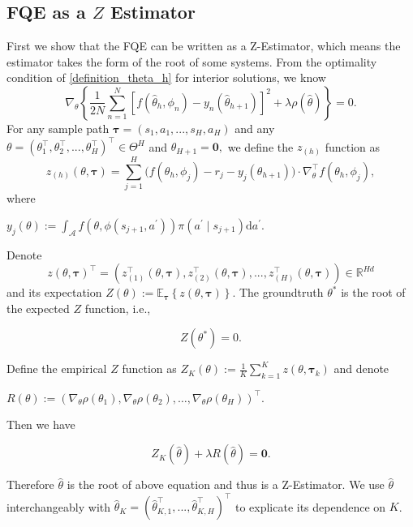 \documentclass{article}
\numberwithin{equation}{section}
\theoremstyle{plain}
\theoremstyle{definition}
\theoremstyle{remark}
\begin{document}
\subsection{FQE as a $Z$ Estimator}
First we show that the FQE can be written as a Z-Estimator, which means the estimator takes the form of the root of some systems. From the optimality condition of \eqref{definition_theta_h} for interior solutions, we know 
    $$
    \nabla_{\theta}\left\{\frac{1}{2N} \sum_{n=1}^N \left[f(\widehat{\theta}_h,\phi_n) - y_n(\widehat{\theta}_{h+1})\right]^2 + \lambda \rho(\widehat{\theta})\right\} = 0.
    $$
For any sample path $\boldsymbol{\tau} = (s_1,a_1,...,s_H,a_H)$ and any $\theta = (\theta_1^{\top},\theta_2^{\top},...,\theta_H^{\top})^{\top} \in \Theta^H$ and $\theta_{H+1} = \boldsymbol{0},$ we define the $z_{(h)}$ function as
\begin{equation*}
    z_{(h)}(\theta,\boldsymbol{\tau}) = \sum_{j=1}^H \bigg(f(\theta_h,\phi_j) - r_j - y_j(\theta_{h+1})\bigg) \cdot \nabla_{\theta}^{\top} f(\theta_h,\phi_j),
\end{equation*}
where \begin{footnotesize}$y_j(\theta) := \int_{\mathcal{A}} f(\theta,\phi(s_{j+1},a^{\prime})) \pi(a^{\prime}\mid s_{j+1}) \mathrm{d} a^{\prime}.$ \end{footnotesize} Denote 
$$z(\theta,\boldsymbol{\tau})^{\top} = (z_{(1)}^{\top}(\theta,\boldsymbol{\tau}),  z_{(2)}^{\top}(\theta,\boldsymbol{\tau}), ..., z_{(H)}^{\top}(\theta,\boldsymbol{\tau})) \in \mathbb{R}^{Hd}$$
and its expectation $Z(\theta) := \mathbb{E}_{\boldsymbol{\tau}} \left\{z(\theta,\boldsymbol{\tau})\right\}.$ The groundtruth $\theta^*$ is the root of the expected $Z$ function, i.e., 
\begin{small}
\begin{equation}
    Z(\theta^*) = 0.
\end{equation}
\end{small}
Define the empirical $Z$ function as $Z_K\left(\theta\right) := \frac{1}{K} \sum_{k=1}^K z(\theta,\boldsymbol{\tau}_k)$ and denote \begin{small} $R(\theta) := (\nabla_{\theta} \rho(\theta_1), \nabla_{\theta} \rho(\theta_2), \ldots, \nabla_{\theta} \rho(\theta_H))^{\top}.$\end{small} Then we have
\begin{small}
\begin{equation}\label{Z-Estimator}
    Z_K(\widehat{\theta}) + \lambda R(\widehat{\theta})= \boldsymbol{0}.
\end{equation}
\end{small}
Therefore $\widehat{\theta}$ is the root of above equation and thus is a Z-Estimator. We use $\widehat \theta$ interchangeably with $\widehat{\theta}_K = (\widehat{\theta}_{K,1}^{\top},...,\widehat{\theta}_{K,H}^{\top})^{\top}$ to explicate its dependence on $K$. 
\end{document}
